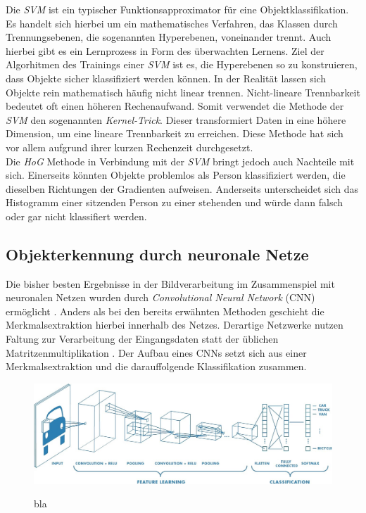 		Die \textit{SVM} ist ein typischer Funktionsapproximator für eine Objektklassifikation. Es handelt sich hierbei um ein mathematisches Verfahren, das Klassen durch Trennungsebenen, die sogenannten Hyperebenen, voneinander trennt. Auch hierbei gibt es ein Lernprozess in Form des überwachten Lernens. Ziel der Algorhitmen des Trainings einer \textit{SVM} ist es, die Hyperebenen so zu konstruieren, dass Objekte sicher klassifiziert werden können. In der Realität lassen sich Objekte rein mathematisch häufig nicht linear trennen. Nicht-lineare Trennbarkeit bedeutet oft einen höheren Rechenaufwand. Somit verwendet die Methode der \textit{SVM} den sogenannten \textit{Kernel-Trick}. Dieser transformiert Daten in eine höhere Dimension, um eine lineare Trennbarkeit zu erreichen. Diese Methode hat sich vor allem aufgrund ihrer kurzen Rechenzeit durchgesetzt.\\
			
		Die \textit{HoG} Methode in Verbindung mit der \textit{SVM} bringt jedoch auch Nachteile mit sich. Einerseits könnten Objekte problemlos als Person klassifiziert werden, die dieselben Richtungen der Gradienten aufweisen. Anderseits unterscheidet sich das Histogramm einer sitzenden Person zu einer stehenden und würde dann falsch oder gar nicht klassifiert werden.
	
		\subsection{Objekterkennung durch neuronale Netze}
		\label{subsec: Objekterkennung durch neuronale Netze}
		Die bisher besten Ergebnisse in der Bildverarbeitung im Zusammenspiel mit neuronalen Netzen wurden durch \textit{Convolutional Neural Network} (CNN) ermöglicht \cite{deeplearning}. Anders als bei den bereits erwähnten Methoden geschieht die Merkmalsextraktion hierbei innerhalb des Netzes. Derartige Netzwerke nutzen Faltung zur Verarbeitung der Eingangsdaten statt der üblichen Matritzenmultiplikation \cite{deeplearning}. Der Aufbau eines CNNs setzt sich aus einer Merkmalsextraktion und die darauffolgende Klassifikation zusammen.\\ 
		
		\begin{figure}[H]
			\centering
			\includegraphics[scale=0.3]{Bilder/cnn.png}
			\label{fiq: normal cnn}
			\caption{bla}
		\end{figure}
		
